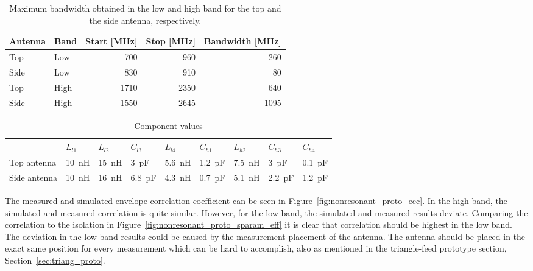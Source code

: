    \begin{table}
      \centering
      \begin{tabular}{|l|l|r|r|r|}
        \hline
        Antenna & Band & Start [MHz] & Stop [MHz] & Bandwidth [MHz] \\
        \hline
        Top     & Low  & 700        & 960       & 260 \\
        Side    & Low  & 830         & 910        & 80 \\
        \hline
        Top     & High & 1710        & 2350       & 640 \\
        Side    & High & 1550        & 2645       & 1095 \\
        \hline
      \end{tabular}
      \caption{Maximum bandwidth obtained in the low and high band for the top and the side antenna, respectively.}
      \label{tab:bw_sol3_proto}
    \end{table}

\begin{table}
  \centering
        \begin{tabular}{|l|l|l|l|l|l|l|l|l|}
            \hline
                         & $L_{l1}$       & $L_{l2}$        & $C_{l3}$      & $L_{l4}$       & $C_{h1}$       & $L_{h2}$      & $C_{h3}$      & $C_{h4}$    \\
            \hline
            Top antenna  & \SI{10}{nH}  & \SI{15}{nH}  & \SI{3}{pF} & \SI{5.6}{nH} & \SI{1.2}{pF} & \SI{7.5}{nH} & \SI{3}{pF} & \SI{0.1}{pF} \\
            Side antenna & \SI{10}{nH}  & \SI{16}{nH}  & \SI{6.8}{pF} & \SI{4.3}{nH} & \SI{0.7}{pF} & \SI{5.1}{nH} & \SI{2.2}{pF} & \SI{1.2}{pF} \\
            \hline
        \end{tabular}
        \caption{Component values}
        \label{fig:ant3schematic_proto}
\end{table}

The measured and simulated envelope correlation coefficient can be seen in Figure~\ref{fig:nonresonant_proto_ecc}. In the high band, the simulated and measured correlation is quite similar. However, for the low band, the simulated and measured results deviate. Comparing the correlation to the isolation in Figure~\ref{fig:nonresonant_proto_sparam_eff} it is clear that correlation should be highest in the low band. The deviation in the low band results could be caused by the measurement placement of the antenna. The antenna should be placed in the exact same position for every measurement which can be hard to accomplish, also as mentioned in the triangle-feed prototype section, Section~\ref{sec:triang_proto}.

